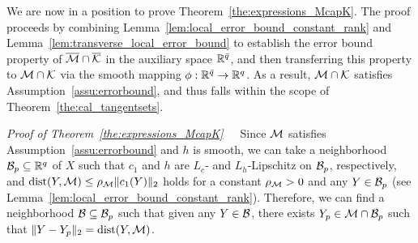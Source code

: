 \bigskip

We are now in a position to prove Theorem~\ref{the:expressions_McapK}. The proof proceeds by combining Lemma~\ref{lem:local_error_bound_constant_rank} and Lemma~\ref{lem:transverse_local_error_bound} to establish the error bound property of $\overline{\mathcal{M}} \cap \overline{\mathcal{K}}$ in the auxiliary space $\mathbb{R}^{\bar{q}}$, and then transferring this property to $\mathcal{M} \cap \mathcal{K}$ via the smooth mapping $\phi:\mathbb{R}^{\bar{q}}\to\mathbb{R}^q$. As a result, $\mathcal{M} \cap \mathcal{K}$ satisfies Assumption~\ref{assu:errorbound}, and thus falls within the scope of Theorem~\ref{the:cal_tangentsets}.

\medskip

\noindent\textit{Proof of Theorem~\ref{the:expressions_McapK}}\ \ \ 
Since $\mathcal{M}$ satisfies Assumption~\ref{assu:errorbound} and $h$ is smooth, we can take a neighborhood $\mathcal{B}_p\subseteq\mathbb{R}^q$ of $X$ such that $c_1$ and $h$ are $L_c$- and $L_h$-Lipschitz on $\mathcal{B}_p$, respectively, and $\operatorname{dist}({Y},\mathcal{M})\le \rho_{\mathcal{M}}\|c_1({Y})\|_2$ holds for a constant $\rho_{\mathcal{M}}>0$ and any ${Y}\in \mathcal{B}_p$ (see Lemma~\ref{lem:local_error_bound_constant_rank}). Therefore, we can find a neighborhood $\mathcal{B}\subseteq \mathcal{B}_p$ such that given any $Y\in \mathcal{B}$, there exists $Y_p\in\mathcal{M}\cap \mathcal{B}_p$ such that $\|Y-Y_p\|_2=\operatorname{dist}(Y,\mathcal{M})$. 

